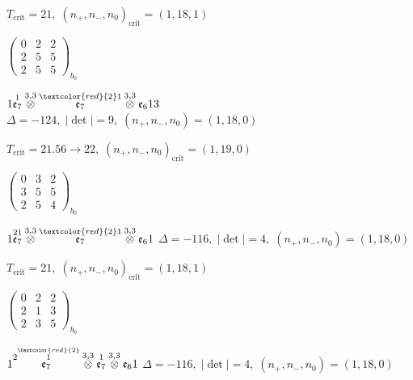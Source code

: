 \documentclass[10pt]{article}
\begin{document}
\hspace{1em}$T_{\text{crit}}=21,\; (n_+,n_-,n_0)_{\text{crit}}=(1,18,1)$

\hspace{2em}$\left(\begin{smallmatrix}0 & 2 & 2 \\ 2 & 5 & 5 \\ 2 & 5 & 5\end{smallmatrix}\right)_{\!b_0}$

\smallskip

$1\overset{1}{\mathfrak{e}_7}\overset{3,3}{\otimes}\overset{\textcolor{red}{2}1}{\mathfrak{e}_7}\overset{3,3}{\otimes}\mathfrak{e}_613$ \quad $\Delta=-124,\; |\det|=9,\; (n_+,n_-,n_0)=(1,18,0)$

\hspace{1em}$T_{\text{crit}}=21.56 \to 22,\; (n_+,n_-,n_0)_{\text{crit}}=(1,19,0)$

\hspace{2em}$\left(\begin{smallmatrix}0 & 3 & 2 \\ 3 & 5 & 5 \\ 2 & 5 & 4\end{smallmatrix}\right)_{\!b_0}$

\smallskip

$1\overset{21}{\mathfrak{e}_7}\overset{3,3}{\otimes}\overset{\textcolor{red}{2}1}{\mathfrak{e}_7}\overset{3,3}{\otimes}\mathfrak{e}_61$ \quad $\Delta=-116,\; |\det|=4,\; (n_+,n_-,n_0)=(1,18,0)$

\hspace{1em}$T_{\text{crit}}=21,\; (n_+,n_-,n_0)_{\text{crit}}=(1,18,1)$

\hspace{2em}$\left(\begin{smallmatrix}0 & 2 & 2 \\ 2 & 1 & 3 \\ 2 & 3 & 5\end{smallmatrix}\right)_{\!b_0}$

$1\overset{2\overset{\textcolor{red}{2}}{1}}{\mathfrak{e}_7}\overset{3,3}{\otimes}\overset{1}{\mathfrak{e}_7}\overset{3,3}{\otimes}\mathfrak{e}_61$ \quad $\Delta=-116,\; |\det|=4,\; (n_+,n_-,n_0)=(1,18,0)$
\end{document}
